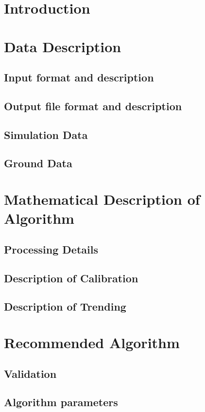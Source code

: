 \documentclass[MS]{spherex}
\begin{document}
\maketitle

\section{Introduction}

\section{Data Description}

\subsection{Input format and description}

\subsection{Output file format and description}

\subsection{Simulation Data}

\subsection{Ground Data}

\section{Mathematical Description of Algorithm}

\subsection{Processing Details}

\subsection{Description of Calibration}

\subsection{Description of Trending}

\section{Recommended Algorithm}

\subsection{Validation}

\subsection{Algorithm parameters}


\end{document}
